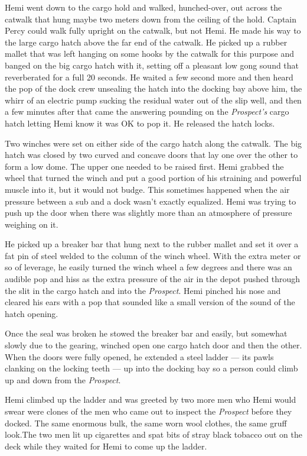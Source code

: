 \documentclass[]{scrbook}
\begin{document}
Hemi went down to the cargo hold and walked, hunched-over, out across
the catwalk that hung maybe two meters down from the ceiling of the
hold. Captain Percy could walk fully upright on the catwalk, but not
Hemi. He made his way to the large cargo hatch above the far end of the
catwalk. He picked up a rubber mallet that was left hanging on some
hooks by the catwalk for this purpose and banged on the big cargo hatch
with it, setting off a pleasant low gong sound that reverberated for a
full 20 seconds. He waited a few second more and then heard the pop of
the dock crew unsealing the hatch into the docking bay above him, the
whirr of an electric pump sucking the residual water out of the slip
well, and then a few minutes after that came the answering pounding on
the \emph{Prospect's} cargo hatch letting Hemi know it was OK to pop it.
He released the hatch locks.

Two winches were set on either side of the cargo hatch along the
catwalk. The big hatch was closed by two curved and concave doors that
lay one over the other to form a low dome. The upper one needed to be
raised first. Hemi grabbed the wheel that turned the winch and put a
good portion of his straining and powerful muscle into it, but it would
not budge. This sometimes happened when the air pressure between a sub
and a dock wasn't exactly equalized. Hemi was trying to push up the door
when there was slightly more than an atmosphere of pressure weighing on
it.

He picked up a breaker bar that hung next to the rubber mallet and set
it over a fat pin of steel welded to the column of the winch wheel. With
the extra meter or so of leverage, he easily turned the winch wheel a
few degrees and there was an audible pop and hiss as the extra pressure
of the air in the depot pushed through the slit in the cargo hatch and
into the \emph{Prospect}. Hemi pinched his nose and cleared his ears
with a pop that sounded like a small version of the sound of the hatch
opening.

Once the seal was broken he stowed the breaker bar and easily, but
somewhat slowly due to the gearing, winched open one cargo hatch door
and then the other. When the doors were fully opened, he extended a
steel ladder --- its pawls clanking on the locking teeth --- up into the
docking bay so a person could climb up and down from the
\emph{Prospect}.

Hemi climbed up the ladder and was greeted by two more men who Hemi
would swear were clones of the men who came out to inspect the
\emph{Prospect} before they docked. The same enormous bulk, the same
worn wool clothes, the same gruff look.The two men lit up cigarettes and
spat bits of stray black tobacco out on the deck while they waited for
Hemi to come up the ladder.
\end{document}
